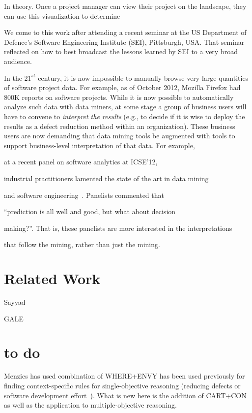 \documentclass[runningheads]{llncs}
\begin{document}
In theory. Once a project manager can view their project on the landscape,
they can use this visualization to determine

We come to this work after attending a recent seminar at the US 
Department of Defence's Software Engineering Institute (SEI), Pittsburgh, USA.
That seminar reflected on how to best broadcast the lessons learned by SEI
to a very broad audience.

In the $21^{st}$ century, it is now impossible to manually browse very
large quantities of software project data.
For example, as of October 2012,
Mozilla Firefox had 800K reports on software projects.  While it is
now possible to automatically analyze such data with data miners, at
some stage a group of business users will have to convene to {\em
  interpret the results} (e.g., to decide if it is wise to deploy the
results as a defect reduction method within an organization).
These business  users are now demanding that data mining tools
be augmented with tools to support  business-level
interpretation of that data. For example,

at a recent panel on software analytics at ICSE'12,

industrial practitioners lamented the state of the art in data mining

and software engineering~\cite{menzies12a}. Panelists commented that

``prediction is all well and good, but what about decision

making?''. That is, these panelists are more interested in the interpretations

that follow the mining, rather than just  the mining.


\section{Related Work}

Sayyad

GALE


\section{to do}

Menzies has used combination of WHERE+ENVY has been
used previously for finding context-specific rules
for single-objective reasoning (reducing defects or
software development effort~\cite{me12d}).  What is
new here is the addition of CART+CON as well as the
application to multiple-objective reasoning.

{\scriptsize



}
\end{document}
